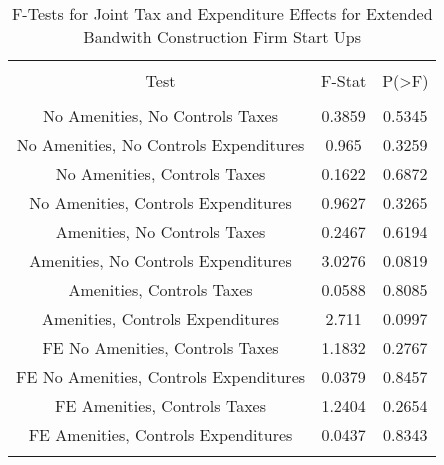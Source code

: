 
\begin{table}[!htbp] \centering 
  \caption{F-Tests for Joint Tax and Expenditure Effects for Extended Bandwith Construction Firm Start Ups} 
  \label{23Ftests} 
\begin{tabular}{@{\extracolsep{5pt}} ccc} 
\\[-1.8ex]\hline 
\hline \\[-1.8ex] 
Test & F-Stat & P(\textgreater F) \\ 
\hline \\[-1.8ex] 
No Amenities, No Controls Taxes & 0.3859 & 0.5345 \\ 
No Amenities, No Controls Expenditures & 0.965 & 0.3259 \\ 
No Amenities, Controls Taxes & 0.1622 & 0.6872 \\ 
No Amenities, Controls Expenditures & 0.9627 & 0.3265 \\ 
Amenities, No Controls Taxes & 0.2467 & 0.6194 \\ 
Amenities, No Controls Expenditures & 3.0276 & 0.0819 \\ 
Amenities, Controls Taxes & 0.0588 & 0.8085 \\ 
Amenities, Controls Expenditures & 2.711 & 0.0997 \\ 
FE No Amenities, Controls Taxes & 1.1832 & 0.2767 \\ 
FE No Amenities, Controls Expenditures & 0.0379 & 0.8457 \\ 
FE Amenities, Controls Taxes & 1.2404 & 0.2654 \\ 
FE Amenities, Controls Expenditures & 0.0437 & 0.8343 \\ 
\hline \\[-1.8ex] 
\end{tabular} 
\end{table} 
